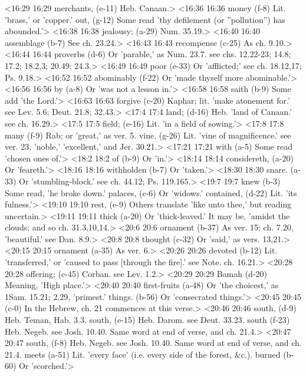 <16:29 16:29  merchants, (e-11)  Heb. Canaan.>
<16:36 16:36  money (f-8)  Lit. 'brass,' or 'copper.'
  out, (g-12)  Some read 'thy defilement (or ''pollution'') has abounded.'>
<16:38 16:38  jealousy; (a-29)  Num. 35.19.>
<16:40 16:40  assemblage (b-7)  See ch. 23.24.>
<16:43 16:43  recompense (c-25)  As ch. 9.10.>
<16:44 16:44  proverbs (d-6)  Or 'parable,' as Num. 23.7. see chs. 12.22-23; 14.8; 17.2;  18.2,3; 20.49; 24.3.>
<16:49 16:49  poor (e-33)  Or 'afflicted;' see ch. 18.12,17; Ps. 9.18.>
<16:52 16:52  abominably (f-22)  Or 'made thyself more abominable.'>
<16:56 16:56  by (a-8)  Or 'was not a lesson in.'>
<16:58 16:58  saith (b-9)  Some add 'the Lord.'>
<16:63 16:63  forgive (c-20)  Kaphar; lit. 'make atonement for.' see Lev. 5.6; Deut.  21.8; 32.43.>
<17:4 17:4  land; (d-16)  Heb. 'land of Canaan.' see ch. 16.29.>
<17:5 17:5  field; (e-16)  Lit. 'in a field of sowing.'>
<17:8 17:8  many (f-9)  Rab; or 'great,' as ver. 5.
  vine. (g-26)  Lit. 'vine of magnificence.' see ver. 23, 'noble,'  'excellent,' and Jer. 30.21.>
<17:21 17:21  with (a-5)  Some read 'chosen ones of.'>
<18:2 18:2  of (b-9)  Or 'in.'>
<18:14 18:14  considereth, (a-20)  Or 'feareth.'>
<18:16 18:16  withholden (b-7)  Or 'taken.'>
<18:30 18:30  snare. (a-33)  Or 'stumbling-block.' see ch. 44.12; Ps. 119.165.>
<19:7 19:7  knew (b-3)  Some read, 'he broke down.'
  palaces, (c-6)  Or 'widows.'
  contained, (d-22)  Lit. 'its fulness.'>
<19:10 19:10  rest, (e-9)  Others translate 'like unto thee,' but reading uncertain.>
<19:11 19:11  thick (a-20)  Or 'thick-leaved.' It may be, 'amidst the clouds; and so ch. 31.3,10,14.>
<20:6 20:6  ornament (b-37)  As ver. 15; ch. 7.20, 'beautiful.' see Dan. 8.9.>
<20:8 20:8  thought (c-32)  Or 'said,' as vers. 13,21.>
<20:15 20:15  ornament (a-35)  As ver. 6.>
<20:26 20:26  devoted (b-12)  Lit. 'transferred,' or 'caused to pass [through the fire].'  see Note. ch. 16.21.>
<20:28 20:28  offering; (c-45)  Corban. see Lev. 1.2.>
<20:29 20:29  Bamah (d-20)  Meaning, 'High place.'>
<20:40 20:40  first-fruits (a-48)  Or 'the choicest,' as 1Sam. 15.21; 2.29, 'primest.'
  things. (b-56)  Or 'consecrated things.'>
<20:45 20:45   (c-0)  In the Hebrew, ch. 21 commences at this verse.>
<20:46 20:46  south, (d-9)  Heb. Teman, Hab. 3.3.
  south, (e-15)  Heb. Darom. see Deut. 33.23.
  south (f-23)  Heb. Negeb. see Josh. 10.40. Same word at end of verse, and  ch. 21.4.>
<20:47 20:47  south, (f-8)  Heb. Negeb. see Josh. 10.40. Same word at end of verse, and  ch. 21.4.
  meets (a-51)  Lit. 'every face' (i.e. every side of the forest, &c.).
  burned (b-60)  Or 'scorched.'>
